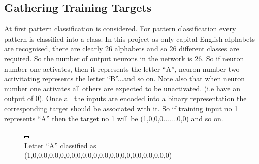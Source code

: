 \documentclass[a4paper,12pt]{report}
\begin{document}
\begin{figure}
\begin{subfigure}[h!]{0.3\textwidth}
        \end{subfigure}
\end{figure}
\clearpage
\subsection*{Gathering Training Targets}
At first pattern classification is considered. For pattern classification every pattern is classified into a class. In this project as only 
capital English alphabets are recognised, there are clearly 26 alphabets and so 26 different classes are required.
So the number of output neurons in the network is 26. So if neuron number one activates, then it represents the letter ``A'', neuron number two activitating represents the letter ``B''...and so on.
Note also that when neuron number one activates all others are expected to be unactivated. (i.e have an output of 0). Once all the inputs are encoded into a binary 
representation the corresponding target should be associated with it. So if training input no 1 represents ``A'' then the target no 1 
will be (1,0,0,0.......0,0) and so on.\\

\begin{figure}[h!]
\centering
\includegraphics[width=\linewidth/2]{A.png} 
\caption{Letter ``A'' classified as (1,0,0,0,0,0,0,0,0,0,0,0,0,0,0,0,0,0,0,0,0,0,0,0,0,0)}
\end{figure}
\end{document}
